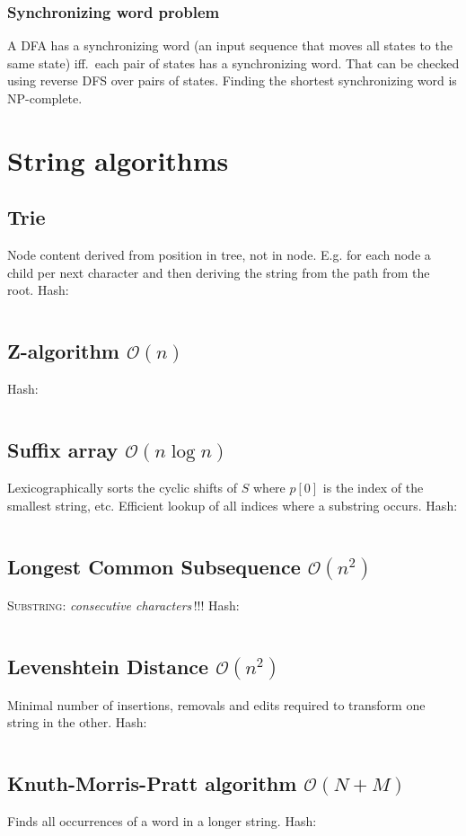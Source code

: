 \documentclass[9pt,a4paper,landscape,oneside]{amsart}
\newcommand{\mintedstyle}[2]{\inputminted{#1}{code/#2}}
\newcommand{\code}[1]{ Hash: 
\mintedstyle{cpp}{#1}}
\begin{document}
\begin{multicols*}{3}
\subsubsection{Synchronizing word problem}
A DFA has a synchronizing word (an input sequence that moves all states
to the same state) iff.\ each pair of states has a synchronizing word.
That can be checked using reverse DFS over pairs of states. Finding the
shortest synchronizing word is NP-complete.

\section{String algorithms}
\subsection{Trie} Node content derived from position in tree, not in node. E.g. for each node a child per next character and then deriving the string from the path from the root.
\code{strings/trie.cpp}

\subsection{Z-algorithm $\mathcal{O}(n)$}
\code{strings/z_function.cpp}

\subsection{Suffix array $\mathcal{O}(n \log{n})$}
Lexicographically sorts the cyclic shifts of $S$ where $p[0]$ is the index of the smallest string, etc. Efficient lookup of all indices where a substring occurs.
\code{strings/suffixarray.cpp}

\subsection{Longest Common Subsequence $\mathcal{O}(n^{2})$}
\textsc{Substring}: \textit{consecutive characters}\,!!!
\code{strings/lcs.cpp}

\subsection{Levenshtein Distance $\mathcal{O}(n^{2})$}
Minimal number of insertions, removals and edits required to transform one string in the other.
\code{strings/edit_dist.cpp}

\subsection{Knuth-Morris-Pratt algorithm $\mathcal{O}(N + M)$} Finds all occurrences of a word in a longer string.
\code{strings/kmp.cpp}


\end{multicols*}
\end{document}
